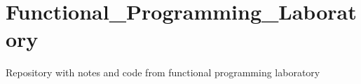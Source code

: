 \chapter{Functional\+\_\+\+Programming\+\_\+\+Laboratory }
\hypertarget{md__r_e_a_d_m_e}{}\label{md__r_e_a_d_m_e}
\label{md__r_e_a_d_m_e_autotoc_md0}%
%


Repository with notes and code from functional programming laboratory 
